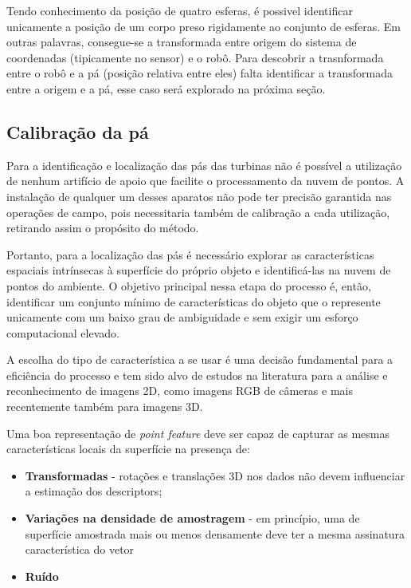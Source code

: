 Tendo conhecimento da posição de quatro esferas, é possivel identificar
unicamente a posição de um corpo preso rigidamente ao conjunto de esferas. Em outras palavras, consegue-se a
transformada entre origem do sistema de coordenadas (tipicamente no sensor) e o robô. Para descobrir a trasnformada entre o robô e a pá (posição relativa entre eles) falta identificar a
transformada entre a origem e a pá, esse caso será explorado na próxima seção.


\subsection{Calibração da pá}

Para a identificação e localização das pás das turbinas não é possível a
utilização de nenhum artifício de apoio que facilite o processamento da nuvem de
pontos. A instalação de qualquer um desses aparatos não pode ter precisão
garantida nas operações de campo, pois necessitaria também de calibração a
cada utilização, retirando assim o propósito do método. 

Portanto, para a localização das pás é
necessário explorar as características espaciais intrínsecas à superfície do
próprio objeto e identificá-las na nuvem de pontos do ambiente. O objetivo
principal nessa etapa do processo é, então, identificar um conjunto mínimo de
características do objeto que o represente unicamente com um baixo grau
de ambiguidade e sem exigir um esforço computacional elevado.

A escolha do tipo de característica a se usar é uma decisão fundamental para a
eficiência do processo e tem sido alvo de estudos na literatura para a análise
e reconhecimento de imagens 2D, como imagens RGB de câmeras e mais recentemente
também para imagens 3D. 

Uma boa representação de \textit{point feature} deve ser capaz de capturar as
mesmas características locais da superfície na presença de:

\begin{itemize}
  \item \textbf{Transformadas} -  rotações e translações 3D nos dados não devem
  influenciar a estimação dos descriptors;
  \item \textbf{Variações na densidade de amostragem} - em princípio, uma de
  superfície amostrada mais ou menos densamente deve ter a mesma assinatura característica do vetor
  \item \textbf{Ruído}
\end{itemize}

